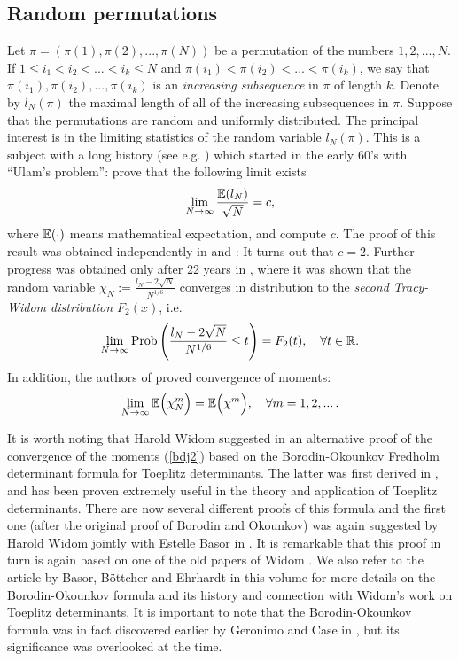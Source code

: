 \documentclass[11pt,letterpaper,reqno]{amsart}
\theoremstyle{definition}
\theoremstyle{remark}
\numberwithin{equation}{section}
\begin{document}
\subsection{Random permutations}
Let $\pi = (\pi(1), \pi(2), ..., \pi(N)) $ be a permutation of the numbers
$1, 2, ..., N$. If $1 \leq i_1 <  i_2 < ... < i_k \leq N$ and
$\pi( i_1) < \pi( i_2) < ... < \pi(i_k)$, we say that $\pi( i_1), \pi( i_2), ...,\pi(i_k)$
is an {\it increasing subsequence } in $\pi$ of length $k$. Denote by $l_{N}(\pi)$
the maximal length of all of the increasing subsequences in $\pi$. Suppose that the
permutations are random and uniformly distributed. The principal interest is  in the
limiting statistics of the random variable $l_{N}(\pi)$. This is a subject with a long history
(see e.g. \cite{AD}) which started in the early 60's  with ``Ulam's problem'': prove that
the following limit exists
\begin{equation}\label{ulam}
\lim_{N\to \infty}\frac{{\Bbb E}(l_N)}{\sqrt{N}} = c,
\end{equation}
where ${\Bbb E (\cdot)}$ means mathematical expectation,
and compute $c$.
The proof  of this result  was obtained independently  in  \cite{VK}
and \cite{logan}: It turns out that $c=2$.  Further progress was obtained only  after 22 years in
\cite{BDJ}, where it was shown  that the random variable
$\chi_{N} := \frac{l_N - 2\sqrt{N}}{N^{1/6}}$
converges   in distribution to the {\it second Tracy-Widom  distribution  $F_2(x)$}, i.e.
\begin{equation}\label{bdj}
\lim_{N \to \infty}\textrm{Prob}\left(\frac{l_N - 2\sqrt{N}}{N^{1/6}} \leq t\right) = F_2(t),
\quad \forall t \in {\Bbb R}.
\end{equation}
In addition, the authors of \cite{BDJ} proved convergence of moments:
\begin{equation}\label{bdj2}
\lim_{N\to \infty}{\Bbb E}\Bigl(\chi_{N}^{m}\Bigr) = {\Bbb E}\Bigl(\chi^{m}\Bigr),
\quad \forall m = 1, 2, ...\,.
\end{equation}

It is worth noting that Harold Widom suggested  in \cite{wmoments} an alternative proof of the
convergence of the moments  (\ref{bdj2}) based on the Borodin-Okounkov Fredholm determinant
formula for Toeplitz determinants. The latter was first derived in  \cite{BoOk}, and has been proven extremely
useful in the theory and application  of Toeplitz determinants. There are now several different  proofs  of this  formula and the first
one (after the original proof of Borodin and Okounkov)  was again suggested by Harold Widom jointly with Estelle Basor in
\cite{wb}.  It is remarkable that this proof in turn is again based on one of the old papers of Widom \cite{wbo}. We also refer to the article by Basor, B\"ottcher and Ehrhardt \cite{BBE} in this volume for more
details on the Borodin-Okounkov formula and its history and connection with Widom's work on Toeplitz determinants.
It is important to note that the Borodin-Okounkov formula was in fact discovered
earlier by Geronimo and Case in \cite{GC}, but its significance was overlooked at the time.
\end{document}
